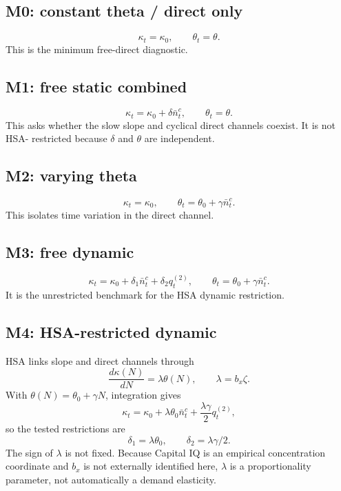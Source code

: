 \documentclass[11pt]{article}
\newcommand{\Nbar}{\bar n}
\begin{document}
\subsection{M0: constant theta / direct only}
\begin{equation}
\kappa_t=\kappa_0,\qquad \theta_t=\theta.
\end{equation}
This is the minimum free-direct diagnostic.

\subsection{M1: free static combined}
\begin{equation}
\kappa_t=\kappa_0+\delta\Nbar_t^c,\qquad \theta_t=\theta.
\end{equation}
This asks whether the slow slope and cyclical direct channels coexist. It is not HSA-
restricted because $\delta$ and $\theta$ are independent.

\subsection{M2: varying theta}
\begin{equation}
\kappa_t=\kappa_0,\qquad \theta_t=\theta_0+\gamma\Nbar_t^c.
\end{equation}
This isolates time variation in the direct channel.

\subsection{M3: free dynamic}
\begin{equation}
\kappa_t=\kappa_0+\delta_1\Nbar_t^c+\delta_2q_t^{(2)},
\qquad \theta_t=\theta_0+\gamma\Nbar_t^c.
\end{equation}
It is the unrestricted benchmark for the HSA dynamic restriction.

\subsection{M4: HSA-restricted dynamic}
HSA links slope and direct channels through
\begin{equation}
\frac{d\kappa(N)}{dN}=\lambda\theta(N),\qquad \lambda=b_x\zeta.
\end{equation}
With $\theta(N)=\theta_0+\gamma N$, integration gives
\begin{equation}
\kappa_t=\kappa_0+\lambda\theta_0\Nbar_t^c
+\frac{\lambda\gamma}{2}q_t^{(2)},
\end{equation}
so the tested restrictions are
\begin{equation}
\boxed{\delta_1=\lambda\theta_0,\qquad
\delta_2=\lambda\gamma/2.}
\end{equation}
The sign of $\lambda$ is not fixed. Because Capital IQ is an empirical concentration
coordinate and $b_x$ is not externally identified here, $\lambda$ is a proportionality
parameter, not automatically a demand elasticity.
\end{document}
